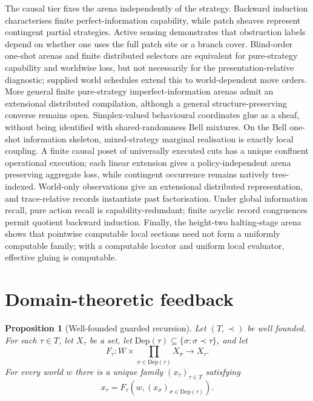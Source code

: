 \documentclass[11pt]{article}
\theoremstyle{plain}
\newtheorem{proposition}[theorem]{Proposition}
\theoremstyle{definition}
\theoremstyle{remark}
\begin{document}
The causal tier fixes the arena independently of the strategy. Backward
induction characterises finite perfect-information capability, while patch
sheaves represent contingent partial strategies. Active sensing demonstrates
that obstruction labels depend on whether one uses the full patch site or a
branch cover. Blind-order one-shot arenas and finite distributed selectors are
equivalent for pure-strategy capability and worldwise loss, but not necessarily
for the presentation-relative diagnostic; supplied world schedules extend this to
world-dependent move orders. More general finite pure-strategy
imperfect-information arenas admit an extensional distributed compilation,
although a general structure-preserving converse remains open. Simplex-valued
behavioural coordinates glue as a sheaf, without being identified with
shared-randomness Bell mixtures. On the Bell one-shot information skeleton,
mixed-strategy marginal realisation is exactly local coupling. A finite causal
poset of universally executed cuts has a unique confluent operational execution;
each linear extension gives a policy-independent arena preserving aggregate
loss, while contingent occurrence remains natively tree-indexed. World-only
observations give an extensional distributed representation, and trace-relative
records instantiate past factorisation. Under global information recall, pure action recall is capability-redundant;
finite acyclic record congruences permit quotient backward induction. Finally, the height-two halting-stage arena shows that
pointwise computable local sections need not form a uniformly computable family;
with a computable locator and uniform local evaluator, effective gluing is
computable.

\appendix
\section{Domain-theoretic feedback}\label{sec:domain-feedback}

\begin{proposition}[Well-founded guarded recursion]\label{prop:guarded-recursion}
Let $(T,\prec)$ be well founded. For each $\tau\in T$, let $X_\tau$ be a set,
let $\mathrm{Dep}(\tau)\subseteq\{\sigma:\sigma\prec\tau\}$, and let
\[
F_\tau:W\times\prod_{\sigma\in\mathrm{Dep}(\tau)}X_\sigma\to X_\tau.
\]
For every world $w$ there is a unique family $(x_\tau)_{\tau\in T}$ satisfying
\[
x_\tau=F_\tau(w,(x_\sigma)_{\sigma\in\mathrm{Dep}(\tau)}).
\]
\end{proposition}
\end{document}
